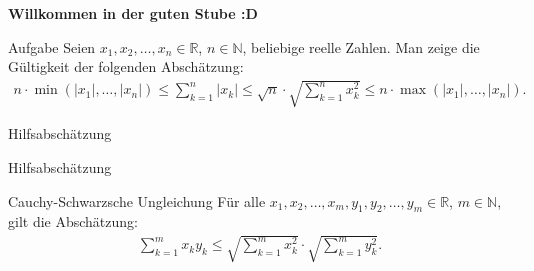 \documentclass[10pt]{beamer}
\title{}
\author{Artur's Mathematikstübchen}
\date{}
\def\bN{\mathbb{N}}
\def\bR{\mathbb{R}}
\begin{document}

\begin{frame}
    \begin{center}
        \textbf{\huge Willkommen in der guten Stube \newline \newline :D}
    \end{center}
\end{frame}




\begin{frame}
    \begin{alertblock}{Aufgabe}
        Seien \( x_{1}, x_{2}, \ldots, x_{n} \in \bR \), \( n \in \bN \), beliebige reelle Zahlen. Man zeige die Gültigkeit der folgenden Abschätzung:
        \begin{align*}
            n \cdot \min\left( \left\vert x_{1} \right\vert, \ldots, \left\vert x_{n} \right\vert \right)
            \leq \sum_{k = 1}^{n} \left\vert x_{k} \right\vert
            \leq \sqrt{n} \cdot \sqrt{\sum_{k = 1}^{n} x_{k}^{2}}
            \leq n \cdot \max\left( \left\vert x_{1} \right\vert, \ldots, \left\vert x_{n} \right\vert \right).
        \end{align*}
    \end{alertblock}
\end{frame}



\begin{frame}{Hilfsabschätzung}
    
\end{frame}



\begin{frame}{Hilfsabschätzung}
    \begin{block}{Cauchy-Schwarzsche Ungleichung}
        Für alle \( x_{1}, x_{2}, \ldots, x_{m}, y_{1}, y_{2}, \ldots, y_{m} \in \bR \), \( m \in \bN \), gilt die Abschätzung:
        \begin{align*}
            \sum_{k = 1}^{m} x_{k} y_{k}
            \leq \sqrt{\sum_{k = 1}^{m} x_{k}^{2}} \cdot \sqrt{\sum_{k = 1}^{m} y_{k}^{2}}.
        \end{align*}
    \end{block}
\end{frame}
\end{document}
